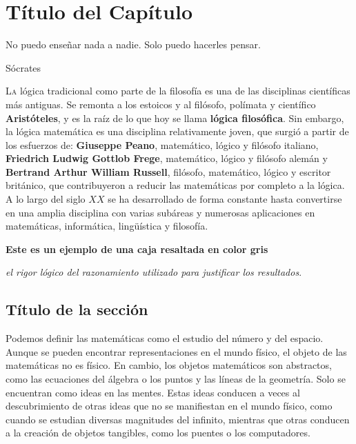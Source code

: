 \chapter{Título del Capítulo}\label{cap:01}
\BgThispage
\thispagestyle{empty}
\pagestyle{isfodosuCD}
\epigraph{No puedo enseñar nada a nadie. Solo puedo hacerles pensar.}{Sócrates}

\lettrine[lraise=0, lines=4, loversize=0]{\textcolor{azulF}{L}}{a} lógica tradicional como parte de la filosofía es una 
de las disciplinas científicas más antiguas. Se remonta a los estoicos y al filósofo, polímata y científico 
\textcolor{azulF}{\textbf{Aristóteles}}, y es la raíz de lo que hoy se llama \textbf{lógica filosófica}. Sin embargo, la 
lógica matemática es una disciplina relativamente joven, que surgió a partir de los esfuerzos de: 
\textcolor{azulF}{\textbf{Giuseppe Peano}}, matemático, lógico y filósofo italiano, \textcolor{azulF}{\textbf{Friedrich 
Ludwig Gottlob Frege}}, matemático, lógico y filósofo alemán y \textcolor{azulF}{\textbf{Bertrand Arthur William 
Russell}}, filósofo, matemático, lógico y escritor británico, que contribuyeron a reducir las matemáticas por completo a 
la lógica. A lo largo del siglo $XX$ se ha desarrollado de forma constante hasta convertirse en una amplia disciplina 
con varias subáreas y numerosas aplicaciones en matemáticas, informática, lingüística y filosofía. 

\medskip

\textbf{Este es un ejemplo de una caja resaltada en color gris}
\begin{caja}
\centering
\textit{el rigor lógico del razonamiento utilizado para justificar los resultados}.
\end{caja}

\section{Título de la sección}

Podemos definir las matemáticas como el estudio del número y del espacio. Aunque se pueden encontrar representaciones en el mundo físico, el objeto de las matemáticas no es físico. En cambio, los objetos matemáticos son abstractos, como las ecuaciones del álgebra o los puntos y las líneas de la geometría. Solo se encuentran como ideas en las mentes. Estas ideas conducen a veces al descubrimiento de otras ideas que no se manifiestan en el mundo físico, como cuando se estudian diversas magnitudes del infinito, mientras que otras conducen a la creación de objetos tangibles, como los puentes o los computadores.

